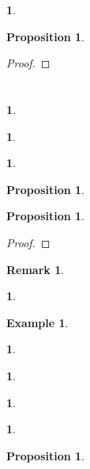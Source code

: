 \documentclass{article}
\newtheorem{env}[term]{}
\newtheorem{example}[term]{Example}
\newtheorem{remark}[term]{Remark}
\newtheorem{proposition}[term]{Proposition}
\begin{document}
\begin{env}
\end{env}

\begin{proposition}
\end{proposition}

\begin{proof}
\end{proof}

\section{}

\begin{env}
\end{env}

\begin{env}
\end{env}

\begin{env}
\end{env}

\begin{proposition}
\end{proposition}

\begin{proposition}
\end{proposition}

\begin{proof}
\end{proof}

\begin{remark}
\end{remark}

\begin{env}
\end{env}

\begin{example}
\end{example}

\begin{env}
\end{env}

\begin{env}
\end{env}

\begin{env}
\end{env}

\begin{env}
\end{env}

\begin{proposition}
\end{proposition}
\end{document}
